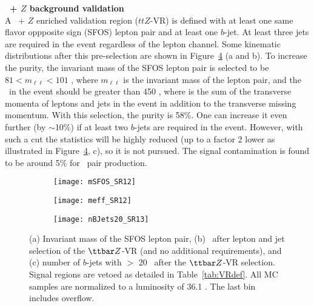 \par{\bf \ttbar\ + $Z$ background validation\\}
A \ttbar\ + $Z$ enriched validation region ($ttZ$-VR) is defined with at least one same flavor oppposite sign (SFOS) lepton pair and at least one $b$-jet. At least three jets are required in the event regardless of the lepton channel. Some kinematic distributions after this pre-selection are shown in Figure~\ref{fig:ttZ_VR_afterLepJetSel} (a and b). To increase the purity, the invariant mass of the SFOS lepton pair is selected to be $81 < m_{\ell\ell} < 101$ \GeV, where 
$m_{\ell\ell}$ is the invariant mass of the lepton pair,
and the \meff\ in the event should be greater than 450 \GeV,
where \meff is the sum of the transverse momenta of leptons and jets in the 
event in addition to the transverse missing momentum. 
With this selection, the purity is 58\%. One can increase it even further (by $\sim$10\%) if at least two $b$-jets are required in the event. However, with such a cut the statistics will be highly reduced (up to a factor 2 lower as illustrated in Figure~\ref{fig:ttZ_VR_afterLepJetSel}, c), so it is not pursued. The signal contamination is found to be around 5\% for \sbsb\ pair production.

\begin{figure}[htb!]
\centering
\begin{subfigure}[t]{0.49\textwidth}
\texttt{[image: mSFOS\_SR12]}
\subcaption{}\label{fig:ttza}\end{subfigure}
\begin{subfigure}[t]{0.49\textwidth}
\texttt{[image: meff\_SR12]}
\subcaption{}\label{fig:ttzb}\end{subfigure}
\begin{subfigure}[t]{0.49\textwidth}
\texttt{[image: nBJets20\_SR13]}
\subcaption{}\label{fig:ttzc}\end{subfigure}
\caption{(a) Invariant mass of the SFOS lepton pair, (b) \meff\ after lepton and jet selection of the $\ttbar Z$-VR (and no additional requirements), and (c) number of $b$-jets with \pt $>$ 20 \GeV~after the $\ttbar Z$-VR selection. Signal regions are vetoed as detailed in Table~\ref{tab:VRdef}. All MC samples are normalized to a luminosity of 36.1 \ifb. The last bin includes overflow.
}
\label{fig:ttZ_VR_afterLepJetSel}
\end{figure} 


